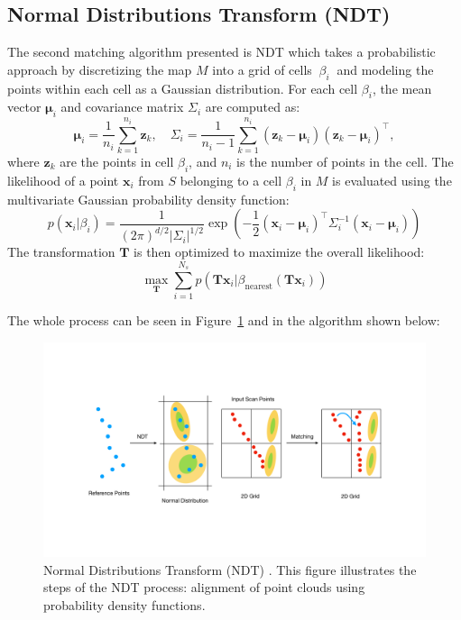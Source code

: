 \subsection*{Normal Distributions Transform (NDT)}
The second matching algorithm presented is NDT \cite{5353908, Liu_Wang_Zhang_2020} which takes a probabilistic approach by discretizing the map \( M \) into a grid of cells \( \ \beta_i \ \) and modeling the points within each cell as a Gaussian distribution. For each cell \( \beta_i \), the mean vector \( \boldsymbol{\mu}_i \) and covariance matrix \( \Sigma_i \) are computed as:
\begin{equation}
    \boldsymbol{\mu}_i = \frac{1}{n_i} \sum_{k=1}^{n_i} \mathbf{z}_k, \quad
    \Sigma_i = \frac{1}{n_i - 1} \sum_{k=1}^{n_i} (\mathbf{z}_k - \boldsymbol{\mu}_i)(\mathbf{z}_k - \boldsymbol{\mu}_i)^\top,
\end{equation}
where \( \mathbf{z}_k \) are the points in cell \( \beta_i \), and \( n_i \) is the number of points in the cell.
The likelihood of a point \( \mathbf{x}_i \) from \( S \) belonging to a cell \( \beta_i \) in \( M \) is evaluated using the multivariate Gaussian probability density function:
\begin{equation}
    p(\mathbf{x}_i | \beta_i) = \frac{1}{(2\pi)^{d/2} |\Sigma_i|^{1/2}} \exp\left(-\frac{1}{2} (\mathbf{x}_i - \boldsymbol{\mu}_i)^\top \Sigma_i^{-1} (\mathbf{x}_i - \boldsymbol{\mu}_i)\right)
\end{equation}
The transformation \( \mathbf{T} \) is then optimized to maximize the overall likelihood:
\begin{equation}
    \max_{\mathbf{T}} \sum_{i=1}^{N_s} p(\mathbf{T} \mathbf{x}_i | \beta_{\text{nearest}}(\mathbf{T} \mathbf{x}_i))
\end{equation} 

The whole process can be seen in Figure~\ref{fig:ndt-figure} and in the algorithm shown below:
\begin{figure}[H]
    \centering
    \includegraphics[width=1\linewidth]{LateX//figs/ndt.pdf}
    \caption{Normal Distributions Transform (NDT) \cite{5353908}. This figure illustrates the steps of the NDT process: alignment of point clouds using probability density functions.}
    \label{fig:ndt-figure}
\end{figure}

